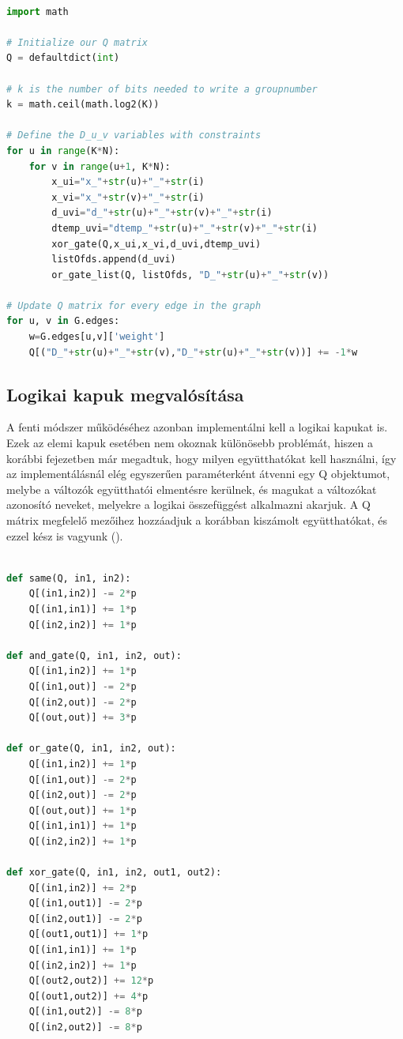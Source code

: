 \begin{lstlisting}[language=python,caption=Maximális K-vágás QUBO (bináris kódolás),label=code:maxKCutQUBOBinary]

import math

# Initialize our Q matrix
Q = defaultdict(int)

# k is the number of bits needed to write a groupnumber
k = math.ceil(math.log2(K))

# Define the D_u_v variables with constraints
for u in range(K*N):
	for v in range(u+1, K*N):
		x_ui="x_"+str(u)+"_"+str(i)
		x_vi="x_"+str(v)+"_"+str(i)
		d_uvi="d_"+str(u)+"_"+str(v)+"_"+str(i)
		dtemp_uvi="dtemp_"+str(u)+"_"+str(v)+"_"+str(i)
		xor_gate(Q,x_ui,x_vi,d_uvi,dtemp_uvi)
		listOfds.append(d_uvi)
		or_gate_list(Q, listOfds, "D_"+str(u)+"_"+str(v))

# Update Q matrix for every edge in the graph
for u, v in G.edges:
	w=G.edges[u,v]['weight']
	Q[("D_"+str(u)+"_"+str(v),"D_"+str(u)+"_"+str(v))] += -1*w

\end{lstlisting}

\subsection{Logikai kapuk megvalósítása}

A fenti módszer működéséhez azonban implementálni kell a logikai kapukat is.
Ezek az elemi kapuk esetében nem okoznak különösebb problémát, hiszen a korábbi fejezetben már megadtuk, hogy milyen együtthatókat kell használni, így az implementálásnál elég egyszerűen paraméterként átvenni egy Q objektumot, melybe a változók együtthatói elmentésre kerülnek, és magukat a változókat azonosító neveket, melyekre a logikai összefüggést alkalmazni akarjuk. A Q mátrix megfelelő mezőihez hozzáadjuk a korábban kiszámolt együtthatókat, és ezzel kész is vagyunk ().

\begin{lstlisting}[language=python,caption=Elemi kapuk,label=code:ElementaryGates]
	
def same(Q, in1, in2):
	Q[(in1,in2)] -= 2*p
	Q[(in1,in1)] += 1*p
	Q[(in2,in2)] += 1*p

def and_gate(Q, in1, in2, out):
	Q[(in1,in2)] += 1*p
	Q[(in1,out)] -= 2*p
	Q[(in2,out)] -= 2*p
	Q[(out,out)] += 3*p

def or_gate(Q, in1, in2, out):
	Q[(in1,in2)] += 1*p
	Q[(in1,out)] -= 2*p
	Q[(in2,out)] -= 2*p
	Q[(out,out)] += 1*p
	Q[(in1,in1)] += 1*p
	Q[(in2,in2)] += 1*p

def xor_gate(Q, in1, in2, out1, out2):
	Q[(in1,in2)] += 2*p
	Q[(in1,out1)] -= 2*p
	Q[(in2,out1)] -= 2*p
	Q[(out1,out1)] += 1*p
	Q[(in1,in1)] += 1*p
	Q[(in2,in2)] += 1*p
	Q[(out2,out2)] += 12*p
	Q[(out1,out2)] += 4*p
	Q[(in1,out2)] -= 8*p
	Q[(in2,out2)] -= 8*p
	
\end{lstlisting}

